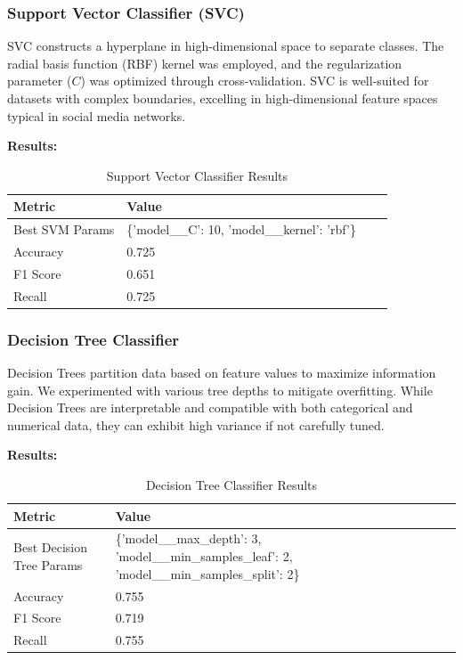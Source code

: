 \documentclass[a4paper,11pt]{article}
\begin{document}
\subsubsection*{Support Vector Classifier (SVC)}
SVC constructs a hyperplane in high-dimensional space to separate classes. The radial basis function (RBF) kernel was employed, and the regularization parameter (\(C\)) was optimized through cross-validation. SVC is well-suited for datasets with complex boundaries, excelling in high-dimensional feature spaces typical in social media networks.

\textbf{Results:}
\begin{table}[h]
    \centering
    \begin{tabular}{|l|l|l|l|}
        \hline
        \textbf{Metric} & \textbf{Value} \\
        \hline
        Best SVM Params & \{'model\_\_C': 10, 'model\_\_kernel': 'rbf'\} \\
        Accuracy & 0.725 \\
        F1 Score & 0.651 \\
        Recall & 0.725 \\
        \hline
    \end{tabular}
    \caption{Support Vector Classifier Results}
\end{table}

\subsubsection*{Decision Tree Classifier}
Decision Trees partition data based on feature values to maximize information gain. We experimented with various tree depths to mitigate overfitting. While Decision Trees are interpretable and compatible with both categorical and numerical data, they can exhibit high variance if not carefully tuned.

\textbf{Results:}
\begin{table}[h]
    \centering
    \begin{tabular}{|l|l|l|l|}
        \hline
        \textbf{Metric} & \textbf{Value} \\
        \hline
        Best Decision Tree Params & \{'model\_\_max\_depth': 3, 'model\_\_min\_samples\_leaf': 2, 'model\_\_min\_samples\_split': 2\} \\
        Accuracy & 0.755 \\
        F1 Score & 0.719 \\
        Recall & 0.755 \\
        \hline
    \end{tabular}
    \caption{Decision Tree Classifier Results}
\end{table}
\end{document}
